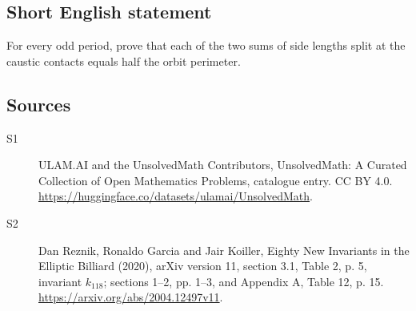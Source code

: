 \documentclass[11pt]{article}
\begin{document}
\subsection{Short English statement}
For every odd period, prove that each of the two sums of side lengths split at the caustic contacts equals half the orbit perimeter.
\subsection{Sources}
\begin{description}
\item[\hypertarget{source:statement:1}{S1}] ULAM.AI and the UnsolvedMath Contributors, UnsolvedMath: A Curated Collection of Open Mathematics Problems, catalogue entry. CC BY 4.0. \url{https://huggingface.co/datasets/ulamai/UnsolvedMath}.
\item[\hypertarget{source:statement:2}{S2}] Dan Reznik, Ronaldo Garcia and Jair Koiller, Eighty New Invariants in the Elliptic Billiard (2020), arXiv version 11, section 3.1, Table 2, p. 5, invariant $k_{118}$; sections 1--2, pp. 1--3, and Appendix A, Table 12, p. 15. \url{https://arxiv.org/abs/2004.12497v11}.
\end{description}
\label{end:statement}
\end{document}
